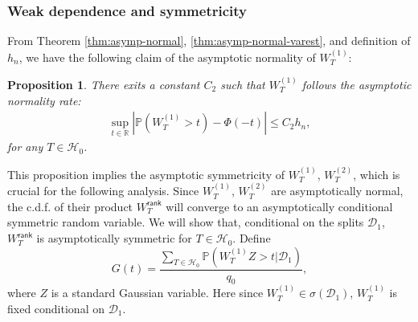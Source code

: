 \documentclass[12pt]{article}
\newcommand{\abs}[1]{\left\lvert#1\right\rvert}
\newcommand{\PP}{\mathbb{P}}
\newcommand{\R}{\mathbb{R}}
\newcommand{\cH}{\mathcal{H}}
\newcommand{\cD}{\mathcal{D}}
\def\PP{{\mathbb P}}
\theoremstyle{plain}
\newtheorem{Proposition}{Proposition}
\begin{document}
\subsubsection{Weak dependence and symmetricity}
From  Theorem \ref{thm:asymp-normal}, \ref{thm:asymp-normal-varest}, and definition of $h_n$, we have the following claim of the asymptotic normality of ${W}^{(1)}_{T}$:
\begin{Proposition}\label{prop:asy-w1}
There exits a constant $C_2$ such that $W^{(1)}_T$ follows the asymptotic normality rate:
\begin{equation}\label{eq:asy-w1}
    \begin{aligned}
    \sup_{t\in\R}\abs{\PP(W^{(1)}_T>t )-\Phi(-t)}\le C_2 h_n,
    \end{aligned}
\end{equation}
for any $T\in \cH_0$.
\end{Proposition}
This proposition implies the asymptotic symmetricity of ${W}^{(1)}_{T}$, ${W}^{(2)}_{T}$, which is crucial for the following analysis. Since ${W}^{(1)}_{T}$, ${W}^{(2)}_{T}$ are asymptotically normal, the c.d.f. of their product $W_T^\mathsf{rank}$ will converge to an asymptotically conditional symmetric random variable. We will show that, conditional on the splits $\cD_1$, $W_T^\mathsf{rank}$ is asymptotically symmetric for $T\in\cH_0$. Define 
\begin{equation*}
    G(t)= \frac{\sum_{T\in\cH_0 } \PP( {W}^{(1)}_{T} Z > t |\cD_1 )   }{q_0},
\end{equation*}
where $Z$ is a standard Gaussian variable. Here since ${W}^{(1)}_{T}\in\sigma(\cD_1)$, ${W}^{(1)}_{T}$ is fixed conditional on $\cD_1$.


\end{document}
